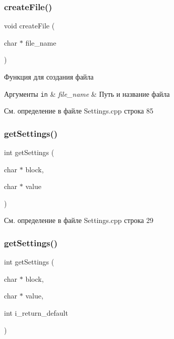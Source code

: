 \mbox{\label{group__settingsh_ga8f34a2030acfb5567678ab2bba25f3c1}} 
\subsubsection{\texorpdfstring{create\+File()}{createFile()}}
{\footnotesize\ttfamily void create\+File (\begin{DoxyParamCaption}\item[{char $\ast$}]{file\+\_\+name }\end{DoxyParamCaption})}



Функция для создания файла 


\begin{DoxyParams}[1]{Аргументы}
\mbox{\tt in}  & {\em file\+\_\+name} & Путь и название файла \\
\hline
\end{DoxyParams}


См. определение в файле Settings.\+cpp строка 85

\mbox{\label{group__settingsh_ga68b4d9ed6be7aaa93d9a6fe8fd683862}} 
\subsubsection{\texorpdfstring{get\+Settings()}{getSettings()}\hspace{0.1cm}{\footnotesize\ttfamily [1/2]}}
{\footnotesize\ttfamily int get\+Settings (\begin{DoxyParamCaption}\item[{char $\ast$}]{block,  }\item[{char $\ast$}]{value }\end{DoxyParamCaption})}



См. определение в файле Settings.\+cpp строка 29

\mbox{\label{group__settingsh_ga0a2fe94de4037eda33c49fe332970891}} 
\subsubsection{\texorpdfstring{get\+Settings()}{getSettings()}\hspace{0.1cm}{\footnotesize\ttfamily [2/2]}}
{\footnotesize\ttfamily int get\+Settings (\begin{DoxyParamCaption}\item[{char $\ast$}]{block,  }\item[{char $\ast$}]{value,  }\item[{int}]{i\+\_\+return\+\_\+default }\end{DoxyParamCaption})}



